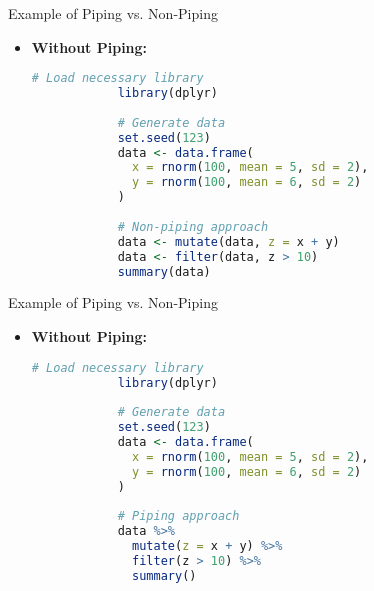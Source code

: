 \documentclass[serif, 9pt, aspectratio=32]{beamer}
\begin{document}
\begin{frame}[fragile]{Example of Piping vs. Non-Piping}
    \begin{itemize}
        \setlength{\itemsep}{2em}
        \item \textbf{Without Piping:}
              \begin{lstlisting}[language=R]
            # Load necessary library
            library(dplyr)
            
            # Generate data
            set.seed(123)
            data <- data.frame(
              x = rnorm(100, mean = 5, sd = 2),
              y = rnorm(100, mean = 6, sd = 2)
            )
            
            # Non-piping approach
            data <- mutate(data, z = x + y)
            data <- filter(data, z > 10)
            summary(data)
        \end{lstlisting}
    \end{itemize}
\end{frame}

\begin{frame}[fragile]{Example of Piping vs. Non-Piping}
    \begin{itemize}
        \setlength{\itemsep}{2em}
        \item \textbf{Without Piping:}
              \begin{lstlisting}[language=R]
            # Load necessary library
            library(dplyr)
            
            # Generate data
            set.seed(123)
            data <- data.frame(
              x = rnorm(100, mean = 5, sd = 2),
              y = rnorm(100, mean = 6, sd = 2)
            )
            
            # Piping approach
            data %>%
              mutate(z = x + y) %>%
              filter(z > 10) %>%
              summary()
        \end{lstlisting}
    \end{itemize}
\end{frame}
\end{document}
